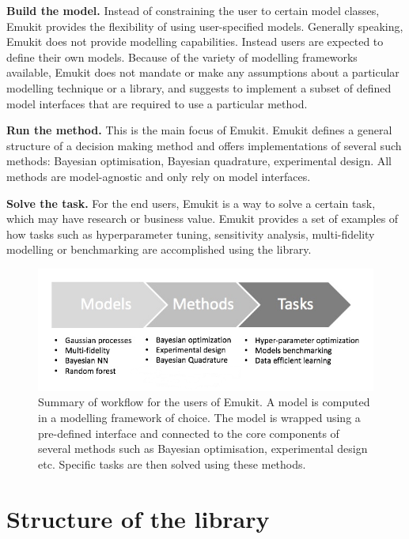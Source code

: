 \textbf{Build the model.} Instead of constraining the user to certain model classes, Emukit provides the flexibility of using user-specified models. Generally speaking, Emukit does not provide modelling capabilities. Instead users are expected to define their own models. Because of the variety of modelling frameworks available, Emukit does not mandate or make any assumptions about a particular modelling technique or a library, and suggests to implement a subset of defined model interfaces that are required to use a particular method.

\textbf{Run the method.} This is the main focus of Emukit. Emukit defines a general structure of a decision making method and offers implementations of several such methods: Bayesian optimisation, Bayesian quadrature, experimental design. All methods are model-agnostic and only rely on model interfaces.

\textbf{Solve the task.} For the end users, Emukit is a way to solve a certain task, which may have research or business value. Emukit provides a set of examples of how tasks such as hyperparameter tuning, sensitivity analysis, multi-fidelity modelling or benchmarking are accomplished using the library.

\begin{figure}[h]
    \centering
    \includegraphics[scale=0.4]{workflow.png}  
    \caption{Summary of workflow for the users of Emukit. A model is computed in a modelling framework of choice. The model is wrapped using a pre-defined interface and connected to the core components of several methods such as Bayesian optimisation, experimental design etc. Specific tasks are then solved using these methods.}
    \label{figure:workflow}
\end{figure}

\section{Structure of the library}\label{sec:lib-structure}

